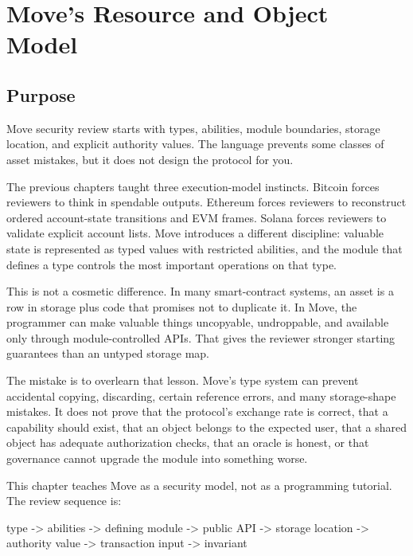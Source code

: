 \chapter{Move's Resource and Object Model}

\section{Purpose}

\begin{principlebox}
Move security review starts with types, abilities, module boundaries, storage location, and explicit authority values. The language prevents some classes of asset mistakes, but it does not design the protocol for you.
\end{principlebox}

The previous chapters taught three execution-model instincts. Bitcoin forces reviewers to think in spendable outputs. Ethereum forces reviewers to reconstruct ordered account-state transitions and EVM frames. Solana forces reviewers to validate explicit account lists. Move introduces a different discipline: valuable state is represented as typed values with restricted abilities, and the module that defines a type controls the most important operations on that type.

This is not a cosmetic difference. In many smart-contract systems, an asset is a row in storage plus code that promises not to duplicate it. In Move, the programmer can make valuable things uncopyable, undroppable, and available only through module-controlled APIs. That gives the reviewer stronger starting guarantees than an untyped storage map.

The mistake is to overlearn that lesson. Move's type system can prevent accidental copying, discarding, certain reference errors, and many storage-shape mistakes. It does not prove that the protocol's exchange rate is correct, that a capability should exist, that an object belongs to the expected user, that a shared object has adequate authorization checks, that an oracle is honest, or that governance cannot upgrade the module into something worse.

This chapter teaches Move as a security model, not as a programming tutorial. The review sequence is:

\begin{codeblock}
type
  -> abilities
  -> defining module
  -> public API
  -> storage location
  -> authority value
  -> transaction input
  -> invariant
\end{codeblock}

